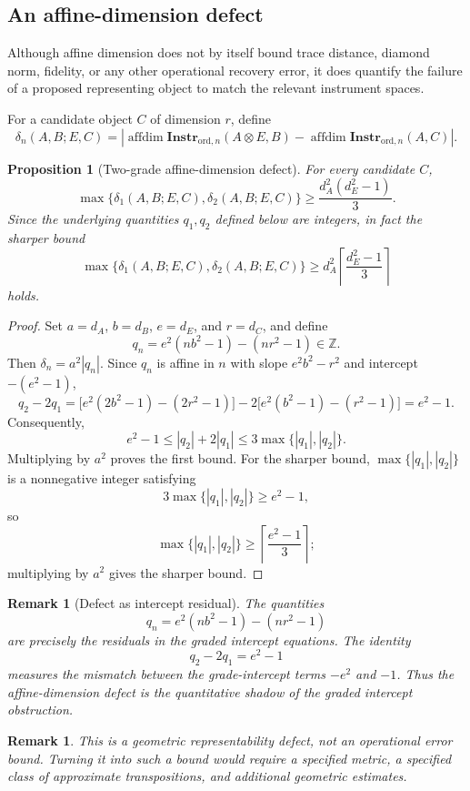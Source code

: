 \documentclass[11pt]{article}
\newtheorem{proposition}[theorem]{Proposition}
\newtheorem{remark}[theorem]{Remark}
\DeclareMathOperator{\affdim}{affdim}
\begin{document}
\subsection{An affine-dimension defect}

Although affine dimension does not by itself bound trace distance, diamond
norm, fidelity, or any other operational recovery error, it does quantify
the failure of a proposed representing object to match the relevant
instrument spaces.

For a candidate object $C$ of dimension $r$, define
\[
\delta_n(A,B;E,C)
=
\left|
\affdim\mathbf{Instr}_{\mathrm{ord},n}(A\otimes E,B)
-
\affdim\mathbf{Instr}_{\mathrm{ord},n}(A,C)
\right|.
\]

\begin{proposition}[Two-grade affine-dimension defect]
\label{prop:dim-defect}
For every candidate $C$,
\[
\max\{\delta_1(A,B;E,C),\delta_2(A,B;E,C)\}
\ge
\frac{d_A^2(d_E^2-1)}{3}.
\]
Since the underlying quantities $q_1,q_2$ defined below are integers, in
fact the sharper bound
\[
\max\{\delta_1(A,B;E,C),\delta_2(A,B;E,C)\}
\ge
d_A^2\left\lceil\frac{d_E^2-1}{3}\right\rceil
\]
holds.
\end{proposition}

\begin{proof}
Set $a=d_A$, $b=d_B$, $e=d_E$, and $r=d_C$, and define
\[
q_n=e^2(nb^2-1)-(nr^2-1)\in\mathbb Z.
\]
Then $\delta_n=a^2|q_n|$. Since $q_n$ is affine in $n$ with slope
$e^2b^2-r^2$ and intercept $-(e^2-1)$,
\[
q_2-2q_1
=\bigl[e^2(2b^2-1)-(2r^2-1)\bigr]-2\bigl[e^2(b^2-1)-(r^2-1)\bigr]
=e^2-1 .
\]
Consequently,
\[
e^2-1
\le |q_2|+2|q_1|
\le 3\max\{|q_1|,|q_2|\}.
\]
Multiplying by $a^2$ proves the first bound. For the sharper bound,
$\max\{|q_1|,|q_2|\}$ is a nonnegative integer satisfying
\[
3\max\{|q_1|,|q_2|\}\ge e^2-1,
\]
so
\[
\max\{|q_1|,|q_2|\}\ge
\left\lceil\frac{e^2-1}{3}\right\rceil;
\]
multiplying by $a^2$ gives the sharper bound.
\end{proof}

\begin{remark}[Defect as intercept residual]
\label{rem:defect-intercept}
The quantities
\[
q_n=e^2(nb^2-1)-(nr^2-1)
\]
are precisely the residuals in the graded intercept equations. The identity
\[
q_2-2q_1=e^2-1
\]
measures the mismatch between the grade-intercept terms $-e^2$ and $-1$.
Thus the affine-dimension defect is the quantitative shadow of the graded
intercept obstruction.
\end{remark}

\begin{remark}
This is a geometric representability defect, not an operational error bound.
Turning it into such a bound would require a specified metric, a specified
class of approximate transpositions, and additional geometric estimates.
\end{remark}
\end{document}
